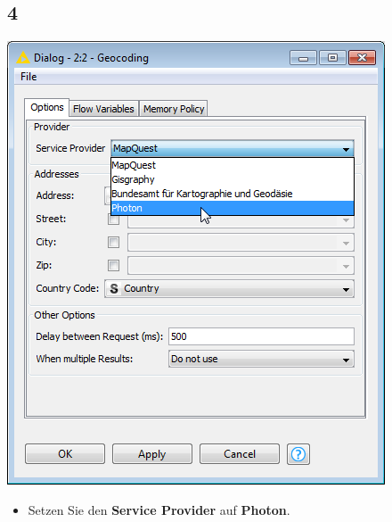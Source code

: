 \documentclass{beamer}
\begin{document}
\subsection{4}
\begin{frame}
	\begin{center}
  		\includegraphics[height=0.6\textheight]{4.png}
	\end{center}
	\begin{itemize}
        \item Setzen Sie den \textbf{Service Provider} auf \textbf{Photon}.
	\end{itemize}
\end{frame}
\end{document}
